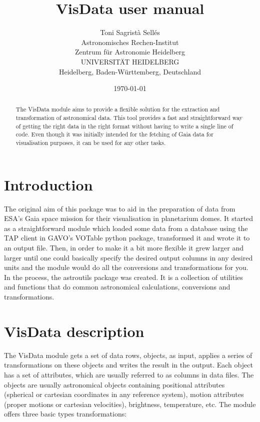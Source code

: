 \documentclass[
a4paper, %
11pt, %
onecolumn, %
openany, %
]{memoir}
\title{VisData user manual}
\author{
        Toni Sagrist\`a Sell\'es \\
        Astronomisches Rechen-Institut\\
	Zentrum f\"ur Astronomie Heidelberg \\
	UNIVERSIT\"AT HEIDELBERG \\
        Heidelberg, Baden-W\"urttemberg, Deutschland
}
\date{\today}
\begin{document}
\maketitle
\small

\begin{abstract}
The VisData module aims to provide a flexible solution for the extraction and transformation
of astronomical data. This tool provides a fast and straightforward way of getting the right
data in the right format without having to write a single line of code.
Even though it was initially intended for the fetching of Gaia data
for visualisation purposes, it can be used for any other tasks.
\end{abstract}

\section{Introduction}
The original aim of this package was to aid in the preparation of data from ESA's Gaia
space mission for their visualisation in planetarium domes. It started as a straightforward module
which loaded some data from a database using the TAP client in GAVO's VOTable python 
package, transformed it and wrote it to an output file. Then, in order to make it a bit more flexible
it grew larger and larger until one could basically specify the desired output columns
in any desired units and the module would do all the conversions and transformations
for you. In the process, the astroutils package was created. It is a collection of utilities and functions
that do common astronomical calculations, conversions and transformations. 


\section{VisData description}\label{description}

The VisData module gets a set of data rows, objects, as input, applies a series of transformations on these
objects and writes the result in the output. Each object has a set of attributes, which are usually referred to as 
columns in data files.
The objects are usually astronomical objects containing positional attributes (spherical or cartesian coordinates in
any reference system), motion attributes (proper motions or cartesian velocities), brightness, temperature, etc.
The module offers three basic types transformations:
\end{document}
